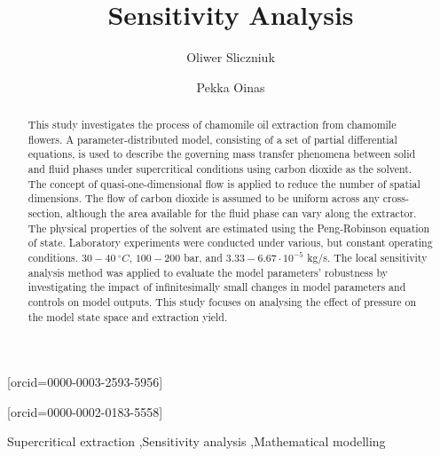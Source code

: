 \documentclass[a4paper,fleqn]{cas-dc}
\begin{document}
 

\title[mode=title]{Sensitivity Analysis}                      


\author[1]{Oliwer Sliczniuk}[orcid=0000-0003-2593-5956]
\cormark[1]

\author[1]{Pekka Oinas}[orcid=0000-0002-0183-5558]


\address[1]{Aalto University, School of Chemical Engineering, Espoo, 02150, Finland}


\begin{abstract}
This study investigates the process of chamomile oil extraction from chamomile flowers. A parameter-distributed model, consisting of a set of partial differential equations, is used to describe the governing mass transfer phenomena between solid and fluid phases under supercritical conditions using carbon dioxide as the solvent. The concept of quasi-one-dimensional flow is applied to reduce the number of spatial dimensions. The {\color{blue}flow of carbon dioxide} is assumed to be uniform across any cross-section, although the area available for the fluid phase can vary along the extractor. The physical properties of the solvent are estimated using the Peng-Robinson equation of state. Laboratory experiments were conducted under various, but constant operating conditions. $30 - 40~^\circ C$, $100 - 200$ bar, and $3.33-6.67 \cdot 10^{-5}$ kg/s. {\color{blue}The local sensitivity analysis method was applied to evaluate the model parameters' robustness by investigating the impact of infinitesimally small changes in model parameters and controls on model outputs}. This study focuses on analysing the effect of pressure on the model state space and extraction yield.

\end{abstract}

\begin{keywords}
Supercritical extraction \sep Sensitivity analysis \sep Mathematical modelling
\end{keywords}
\end{document}
